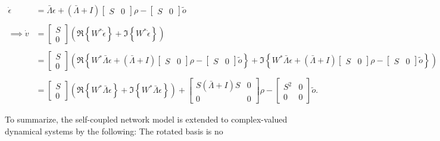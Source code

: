 \begin{align*}
\dot{\epsilon}
&= 
\bar{\Lambda} \epsilon
+
\left( 
\bar{\Lambda} + I
\right)
\begin{bmatrix}
S & 0
\end{bmatrix}
\rho
-
\begin{bmatrix}
S & 0
\end{bmatrix}
\tilde{o}
\\
\\
\implies 
\dot{v} &= \begin{bmatrix}S \\ 0\end{bmatrix} \left( \Re\left\{W^*\dot{\epsilon}\right\} + \Im\left\{W^*\dot{\epsilon}\right\}\right)
\\
\\
&=
\begin{bmatrix}S \\ 0\end{bmatrix} \left( \Re\left\{W^*
\bar{\Lambda} \epsilon
+
\left( 
\bar{\Lambda} + I
\right)
\begin{bmatrix}
S & 0
\end{bmatrix}
\rho
-
\begin{bmatrix}
S & 0
\end{bmatrix}
\tilde{o}
\right\} + \Im\left\{W^*
\bar{\Lambda} \epsilon
+
\left( 
\bar{\Lambda} + I
\right)
\begin{bmatrix}
S & 0
\end{bmatrix}
\rho
-
\begin{bmatrix}
S & 0
\end{bmatrix}
\tilde{o}
\right\}\right)
\\
\\
&=
\begin{bmatrix}
S \\ 0
\end{bmatrix} \left(
\Re\left\{W^*
\bar{\Lambda} \epsilon\right\} + \Im \left\{W^*
\bar{\Lambda} \epsilon\right\}
\right)
+
\begin{bmatrix}
S
\left( 
\bar{\Lambda} + I
\right)
S & 0
\\
0 & 0
\end{bmatrix}
\rho
-
\begin{bmatrix}
S^2 & 0
\\ 0 & 0
\end{bmatrix}
\tilde{o}.
\end{align*}

To summarize, the self-coupled network model is extended to complex-valued dynamical systems by the following:
The rotated basis is no



